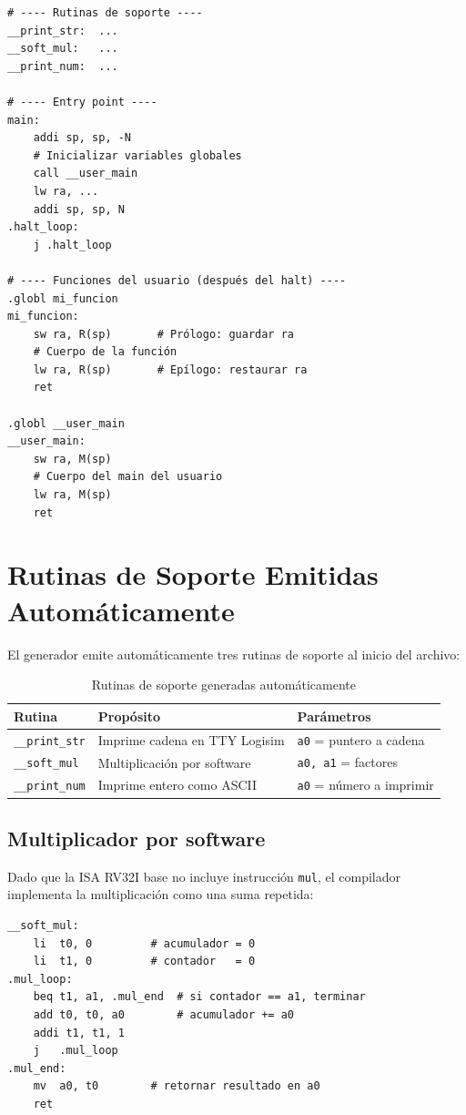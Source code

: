\begin{lstlisting}[style=asmstyle, caption={Estructura del output.s generado}]
# ---- Rutinas de soporte ----
__print_str:  ...
__soft_mul:   ...
__print_num:  ...

# ---- Entry point ----
main:
    addi sp, sp, -N
    # Inicializar variables globales
    call __user_main
    lw ra, ...
    addi sp, sp, N
.halt_loop:
    j .halt_loop

# ---- Funciones del usuario (después del halt) ----
.globl mi_funcion
mi_funcion:
    sw ra, R(sp)       # Prólogo: guardar ra
    # Cuerpo de la función
    lw ra, R(sp)       # Epílogo: restaurar ra
    ret

.globl __user_main
__user_main:
    sw ra, M(sp)
    # Cuerpo del main del usuario
    lw ra, M(sp)
    ret
\end{lstlisting}

\section{Rutinas de Soporte Emitidas Automáticamente}

El generador emite automáticamente tres rutinas de soporte al inicio del archivo:

\begin{table}[H]
\centering
\begin{tabular}{lll}
\toprule
\textbf{Rutina} & \textbf{Propósito} & \textbf{Parámetros} \\
\midrule
\texttt{\_\_print\_str} & Imprime cadena en TTY Logisim & \texttt{a0} = puntero a cadena \\
\texttt{\_\_soft\_mul} & Multiplicación por software & \texttt{a0, a1} = factores \\
\texttt{\_\_print\_num} & Imprime entero como ASCII & \texttt{a0} = número a imprimir \\
\bottomrule
\end{tabular}
\caption{Rutinas de soporte generadas automáticamente}
\label{tab:rutinas}
\end{table}

\subsection{Multiplicador por software}

Dado que la ISA RV32I base no incluye instrucción \texttt{mul}, el compilador implementa la multiplicación como una suma repetida:

\begin{lstlisting}[style=asmstyle, caption={Multiplicador por software: a0 = a0 * a1}]
__soft_mul:
    li  t0, 0         # acumulador = 0
    li  t1, 0         # contador   = 0
.mul_loop:
    beq t1, a1, .mul_end  # si contador == a1, terminar
    add t0, t0, a0        # acumulador += a0
    addi t1, t1, 1
    j   .mul_loop
.mul_end:
    mv  a0, t0        # retornar resultado en a0
    ret
\end{lstlisting}

